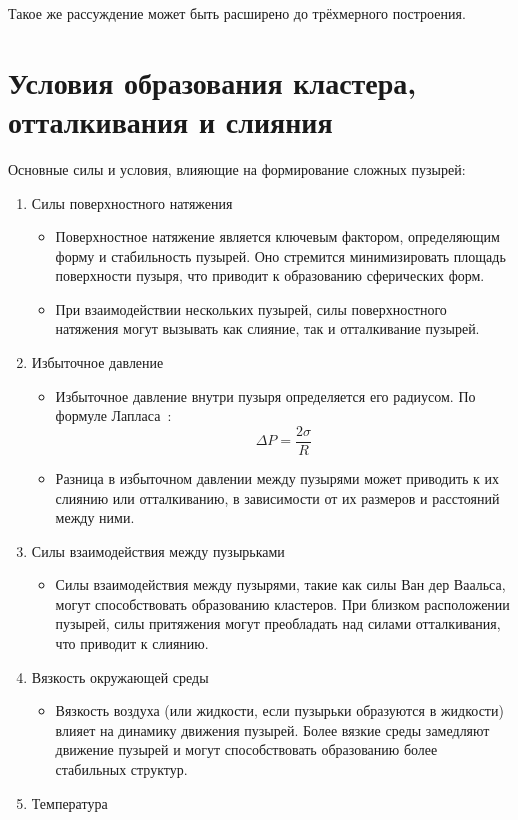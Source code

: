 Такое же рассуждение может быть расширено до трёхмерного построения.
\section{Условия образования кластера, отталкивания и слияния}

Основные силы и условия, влияющие на формирование сложных пузырей:
\begin{enumerate}[label={\arabic*)}]
	\item Силы поверхностного натяжения
	\begin{itemize}	
		\item Поверхностное натяжение является ключевым фактором, определяющим форму и стабильность пузырей. Оно стремится минимизировать площадь поверхности пузыря, что приводит к образованию сферических форм.
		\item При взаимодействии нескольких пузырей, силы поверхностного натяжения могут вызывать как слияние, так и отталкивание пузырей.
	\end{itemize}
	\item Избыточное давление
	\begin{itemize}	
		\item Избыточное давление внутри пузыря определяется его радиусом. По формуле Лапласа~\cite{laplace}: \[ \Delta P = \frac{2\sigma}{R} \]
		\item Разница в избыточном давлении между пузырями может приводить к их слиянию или отталкиванию, в зависимости от их размеров и расстояний между ними.
	\end{itemize}
	\item Силы взаимодействия между пузырьками
	\begin{itemize}	
		\item Силы взаимодействия между пузырями, такие как силы Ван дер Ваальса, могут способствовать образованию кластеров. При близком расположении пузырей, силы притяжения могут преобладать над силами отталкивания, что приводит к слиянию.
	\end{itemize}
	\item Вязкость окружающей среды
	\begin{itemize}	
		\item Вязкость воздуха (или жидкости, если пузырьки образуются в жидкости) влияет на динамику движения пузырей. Более вязкие среды замедляют движение пузырей и могут способствовать образованию более стабильных структур.
	\end{itemize}
	\item Температура

\end{enumerate}
